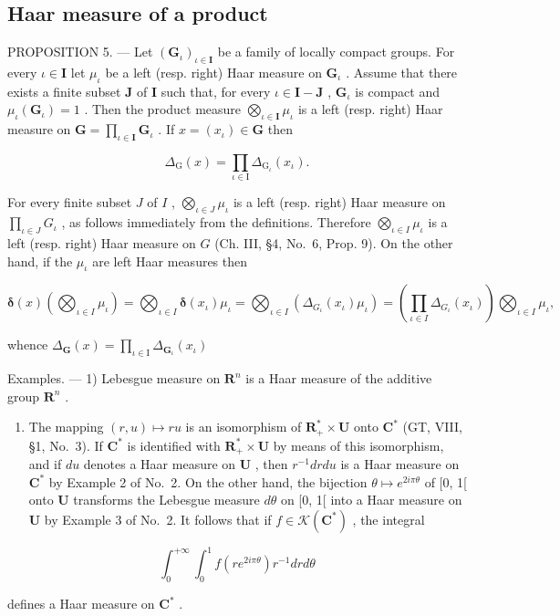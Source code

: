 \subsection{Haar measure of a product}

PROPOSITION 5. --- Let \((\mathbf{G}_{\iota})_{\iota \in \mathbf{I}}\) be a family of locally compact groups. For every \(\iota \in \mathbf{I}\) let \(\mu_{\iota}\) be a left (resp. right) Haar measure on \(\mathbf{G}_{\iota}\) . Assume that there exists a finite subset \(\mathbf{J}\) of \(\mathbf{I}\) such that, for every \(\iota \in \mathbf{I} - \mathbf{J}\) , \(\mathbf{G}_{\iota}\) is compact and \(\mu_{\iota}(\mathbf{G}_{\iota}) = 1\) . Then the product measure \(\bigotimes_{\iota \in \mathbf{I}} \mu_{\iota}\) is a left (resp. right) Haar measure on \(\mathbf{G} = \prod_{\iota \in \mathbf{I}} \mathbf{G}_{\iota}\) . If \(x = (x_{\iota}) \in \mathbf{G}\) then

\[
\Delta_ {\mathrm{G}} (x) = \prod_ {\iota \in \mathrm{I}} \Delta_ {\mathrm{G} _ {\iota}} (x _ {\iota}).
\]

For every finite subset \(J\) of \(I\) , \(\bigotimes_{\iota \in J} \mu_{\iota}\) is a left (resp. right) Haar measure on \(\prod_{\iota \in J} G_{\iota}\) , as follows immediately from the definitions. Therefore \(\bigotimes_{\iota \in I} \mu_{\iota}\) is a left (resp. right) Haar measure on \(G\) (Ch. III, §4, No.~6, Prop. 9). On the other hand, if the \(\mu_{\iota}\) are left Haar measures then

\[
\boldsymbol {\delta} (x) \left(\bigotimes_ {\iota \in I} \mu_ {\iota}\right) = \bigotimes_ {\iota \in I} \boldsymbol {\delta} \left(x _ {\iota}\right) \mu_ {\iota} = \bigotimes_ {\iota \in I} \left(\Delta_ {G _ {\iota}} \left(x _ {\iota}\right) \mu_ {\iota}\right) = \left(\prod_ {\iota \in I} \Delta_ {G _ {\iota}} \left(x _ {\iota}\right)\right) \bigotimes_ {\iota \in I} \mu_ {\iota},
\]

whence \(\Delta_{\mathbf{G}}(x) = \prod_{\iota \in \mathrm{I}}\Delta_{\mathbf{G}_{\iota}}(x_{\iota})\)

Examples. --- 1) Lebesgue measure on \(\mathbf{R}^n\) is a Haar measure of the additive group \(\mathbf{R}^n\) .

\begin{enumerate}
\def\labelenumi{\arabic{enumi})}
\setcounter{enumi}{1}
\tightlist
\item
  The mapping \((r, u) \mapsto ru\) is an isomorphism of \(\mathbf{R}_+^* \times \mathbf{U}\) onto \(\mathbf{C}^*\) (GT, VIII, §1, No.~3). If \(\mathbf{C}^*\) is identified with \(\mathbf{R}_+^* \times \mathbf{U}\) by means of this isomorphism, and if \(du\) denotes a Haar measure on \(\mathbf{U}\) , then \(r^{-1} dr du\) is a Haar measure on \(\mathbf{C}^*\) by Example 2 of No.~2. On the other hand, the bijection \(\theta \mapsto e^{2i\pi\theta}\) of {[}0, 1{[} onto \(\mathbf{U}\) transforms the Lebesgue measure \(d\theta\) on {[}0, 1{[} into a Haar measure on \(\mathbf{U}\) by Example 3 of No.~2. It follows that if \(f \in \mathcal{K}(\mathbf{C}^*)\) , the integral
\end{enumerate}

\[
\int_ {0} ^ {+ \infty} \int_ {0} ^ {1} f (r e ^ {2 i \pi \theta}) r ^ {- 1} d r d \theta
\]

defines a Haar measure on \(\mathbf{C}^*\) .

